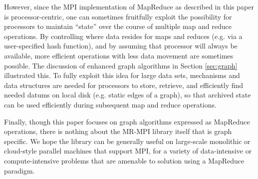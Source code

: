 However, since the MPI implementation of MapReduce as described in
this paper is processor-centric, one can sometimes fruitfully exploit
the possibility for processors to maintain ``state'' over the course
of multiple map and reduce operations.  By controlling where data
resides for maps and reduces (e.g. via a user-specified hash
function), and by assuming that processor will always be available,
more efficient operations with less data movement are sometimes
possible.  The discussion of enhanced graph algorithms in Section
\ref{sec:graph} illustrated this.  To fully exploit this idea for
large data sets, mechanisms and data structures are needed for
processors to store, retrieve, and efficiently find needed datums on
local disk (e.g. static edges of a graph), so that archived state can
be used efficiently during subsequent map and reduce operations.

Finally, though this paper focuses on graph algorithms expressed as
MapReduce operations, there is nothing about the MR-MPI library itself
that is graph specific.  We hope the library can be generally useful
on large-scale monolithic or cloud-style parallel machines that
support MPI, for a variety of data-intensive or compute-intensive
problems that are amenable to solution using a MapReduce paradigm.
